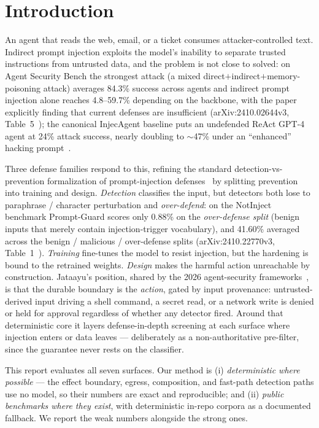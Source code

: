 \documentclass[11pt]{article}
\begin{document}
\section{Introduction}\label{sec:intro}
An agent that reads the web, email, or a ticket consumes attacker-controlled text. Indirect
prompt injection exploits the model's inability to separate trusted instructions from untrusted
data, and the problem is not close to solved: on Agent Security Bench the strongest attack (a mixed
direct$+$indirect$+$memory-poisoning attack) averages 84.3\% success across agents and indirect
prompt injection alone reaches 4.8--59.7\% depending on the backbone, with the paper explicitly
finding that current defenses are insufficient (arXiv:2410.02644v3, Table~5~\cite{asb}); the
canonical InjecAgent baseline puts an undefended ReAct GPT-4 agent at 24\% attack success, nearly
doubling to $\sim$47\% under an ``enhanced'' hacking prompt~\cite{injecagent}.

Three defense families respond to this, refining the standard detection-vs-prevention formalization
of prompt-injection defenses~\cite{survey} by splitting prevention into training and design.
\emph{Detection} classifies the input, but detectors both
lose to paraphrase / character perturbation and \emph{over-defend}: on the NotInject benchmark
Prompt-Guard scores only 0.88\% on the \emph{over-defense split} (benign inputs that merely contain
injection-trigger vocabulary), and 41.60\% averaged across the benign / malicious / over-defense
splits (arXiv:2410.22770v3, Table~1~\cite{injecguard}). \emph{Training} fine-tunes the model to resist injection, but the
hardening is bound to the retrained weights. \emph{Design} makes the harmful action unreachable by
construction. Jataayu's position, shared by the 2026 agent-security frameworks~\cite{owasp}, is that
the durable boundary is the \emph{action}, gated by input provenance: untrusted-derived input
driving a shell command, a secret read, or a network write is denied or held for approval regardless
of whether any detector fired. Around that deterministic core it layers defense-in-depth screening
at each surface where injection enters or data leaves --- deliberately as a non-authoritative
pre-filter, since the guarantee never rests on the classifier.

This report evaluates all seven surfaces. Our method is (i) \emph{deterministic where possible}
--- the effect boundary, egress, composition, and fast-path detection paths use no model, so
their numbers are exact and reproducible; and (ii) \emph{public benchmarks where they exist}, with
deterministic in-repo corpora as a documented fallback. We report the weak numbers alongside the
strong ones.
\end{document}
